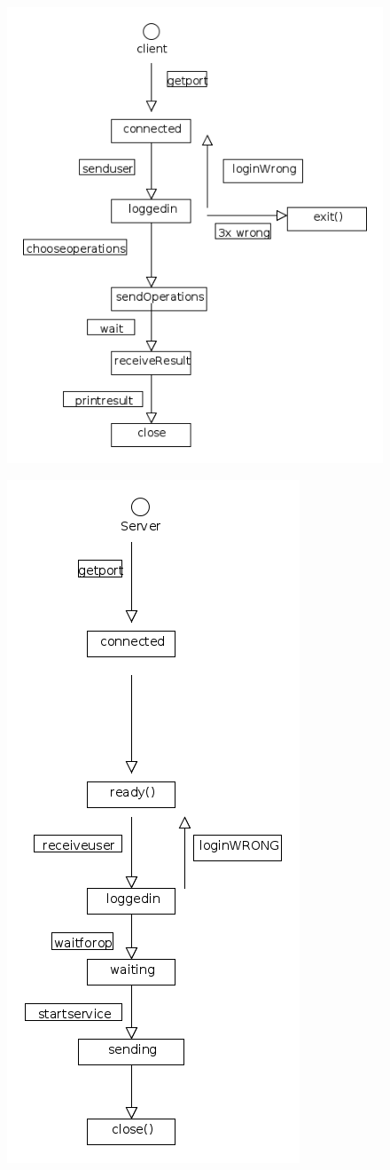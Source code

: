 \documentclass[10pt]{ps-exercise}
\begin{document}
\begin{figure}[H]
\includegraphics[scale=0.6]{client.png}
\end{figure}
\begin{figure}[H]
\includegraphics[scale=0.6]{server.png}
\end{figure}
\end{document}
